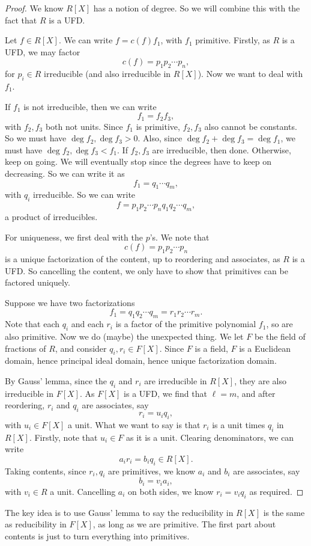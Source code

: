 \documentclass[a4paper]{article}
\begin{document}
\begin{proof}
  We know $R[X]$ has a notion of degree. So we will combine this with the fact that $R$ is a UFD.

  Let $f \in R[X]$. We can write $f = c(f) f_1$, with $f_1$ primitive. Firstly, as $R$ is a UFD, we may factor
  \[
    c(f) = p_1 p_2 \cdots p_n,
  \]
  for $p_i \in R$ irreducible (and also irreducible in $R[X]$). Now we want to deal with $f_1$.

  If $f_1$ is not irreducible, then we can write
  \[
    f_1 = f_2 f_3,
  \]
  with $f_2, f_3$ both not units. Since $f_1$ is primitive, $f_2, f_3$ also cannot be constants. So we must have $\deg f_2, \deg f_3 > 0$. Also, since $\deg f_2 + \deg f_3 = \deg f_1$, we must have $\deg f_2, \deg f_3 < f_1$. If $f_2, f_3$ are irreducible, then done. Otherwise, keep on going. We will eventually stop since the degrees have to keep on decreasing. So we can write it as
  \[
    f_1 = q_1 \cdots q_m,
  \]
  with $q_i$ irreducible. So we can write
  \[
    f = p_1 p_2 \cdots p_n q_1 q_2 \cdots q_m,
  \]
  a product of irreducibles.

  For uniqueness, we first deal with the $p$'s. We note that
  \[
    c(f) = p_1 p_2 \cdots p_n
  \]
  is a unique factorization of the content, up to reordering and associates, as $R$ is a UFD. So cancelling the content, we only have to show that primitives can be factored uniquely.

  Suppose we have two factorizations
  \[
    f_1 = q_1 q_2 \cdots q_m = r_1 r_2 \cdots r_m.
  \]
  Note that each $q_i$ and each $r_i$ is a factor of the primitive polynomial $f_1$, so are also primitive. Now we do (maybe) the unexpected thing. We let $F$ be the field of fractions of $R$, and consider $q_i, r_i \in F[X]$. Since $F$ is a field, $F$ is a Euclidean domain, hence principal ideal domain, hence unique factorization domain.

  By Gauss' lemma, since the $q_i$ and $r_i$ are irreducible in $R[X]$, they are also irreducible in $F[X]$. As $F[X]$ is a UFD, we find that $\ell = m$, and after reordering, $r_i$ and $q_i$ are associates, say
  \[
    r_i = u_i q_i,
  \]
  with $u_i \in F[X]$ a unit. What we want to say is that $r_i$ is a unit times $q_i$ in $R[X]$. Firstly, note that $u_i \in F$ as it is a unit. Clearing denominators, we can write
  \[
    a_i r_i = b_i q_i \in R[X].
  \]
  Taking contents, since $r_i, q_i$ are primitives, we know $a_i$ and $b_i$ are associates, say
  \[
    b_i = v_i a_i,
  \]
  with $v_i \in R$ a unit. Cancelling $a_i$ on both sides, we know $r_i = v_i q_i $ as required.
\end{proof}
The key idea is to use Gauss' lemma to say the reducibility in $R[X]$ is the same as reducibility in $F[X]$, as long as we are primitive. The first part about contents is just to turn everything into primitives.
\end{document}
